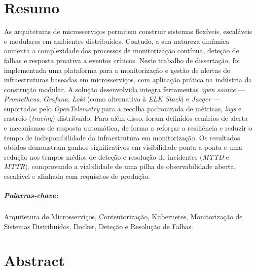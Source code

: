\chapter*{Resumo}

As arquiteturas de microsserviços permitem construir sistemas flexíveis, escaláveis e modulares em ambientes distribuídos. Contudo, a sua natureza dinâmica aumenta a complexidade dos processos de monitorização contínua, deteção de falhas e resposta proativa a eventos críticos.
Neste trabalho de dissertação, foi implementada uma plataforma para a monitorização e gestão de alertas de infraestruturas baseadas em microsserviços, com aplicação prática na indústria da construção modular. A solução desenvolvida integra ferramentas \textit{open source} — \textit{Prometheus}, \textit{Grafana}, \textit{Loki} (como alternativa à \textit{ELK Stack}) e \textit{Jaeger} — suportadas pelo \textit{OpenTelemetry} para a recolha padronizada de métricas, \textit{logs} e rastreio (\textit{tracing}) distribuído.
Para além disso, foram definidos cenários de alerta e mecanismos de resposta automática, de forma a reforçar a resiliência e reduzir o tempo de indisponibilidade da infraestrutura em monitorização.
Os resultados obtidos demonstram ganhos significativos em visibilidade ponta-a-ponta e uma redução nos tempos médios de deteção e resolução de incidentes (\textit{MTTD} e \textit{MTTR}), comprovando a viabilidade de uma pilha de observabilidade aberta, escalável e alinhada com requisitos de produção.


\paragraph{Palavras-chave:} Arquitetura de Microsserviços, Contentorização, Kubernetes, Monitorização de Sistemas Distribuídos, Docker, Deteção e Resolução de Falhas.


\cleardoublepage

\chapter*{Abstract}

